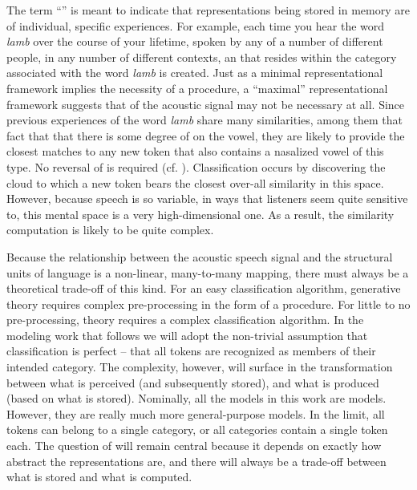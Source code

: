 The term ``'' is meant to indicate that representations being
stored in memory are of individual, specific experiences. For example,
each time you hear the word \textit{lamb} over the course of your lifetime,
spoken by any of a number of different people, in any number of different
contexts, an  that resides within the category associated
with the word \textit{lamb} is created. Just as a minimal representational
framework implies the necessity of a  procedure, a “maximal”
representational framework suggests that  of the acoustic
signal may not be necessary at all. Since previous experiences of
the word \textit{lamb} share many similarities, among them that fact
that that there is some degree of  on the vowel, they
are likely to provide the closest matches to any new token that also
contains a nasalized vowel of this type. No reversal of 
is required (cf. \citealt{Johnson1997a}). Classification occurs by
discovering the cloud to which a new token bears the closest over-all
similarity in this space. However, because speech is so variable,
in ways that listeners seem quite sensitive to, this mental space
is a very high-dimensional one. As a result, the similarity computation
is likely to be quite complex. 

Because the relationship between the acoustic speech signal and the
structural units of language is a non-linear, many-to-many mapping,
there must always be a theoretical trade-off of this kind. For an
easy classification algorithm, generative theory requires complex
pre-processing in the form of a  procedure. For little
to no pre-processing,  theory requires a complex classification
algorithm. In the modeling work that follows we will adopt the non-trivial
assumption that classification is perfect – that all tokens are recognized
as members of their intended category. The complexity, however, will
surface in the transformation between what is perceived (and subsequently
stored), and what is produced (based on what is stored). Nominally,
all the models in this work are  models. However, they are
really much more general-purpose models. In the limit, all tokens
can belong to a single category, or all categories contain a single
token each. The question of  will remain central because
it depends on exactly how abstract the representations are, and there
will always be a trade-off between what is stored and what is computed. 
